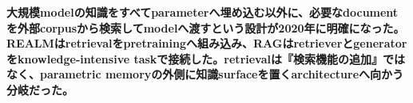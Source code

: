 \noindent\textbf{大規模modelの知識をすべてparameterへ埋め込む以外に、必要なdocumentを外部corpusから検索してmodelへ渡すという設計が2020年に明確になった。REALMはretrievalをpretrainingへ組み込み、RAGはretrieverとgeneratorをknowledge-intensive taskで接続した。retrievalは『検索機能の追加』ではなく、parametric memoryの外側に知識surfaceを置くarchitectureへ向かう分岐だった。}\autocite{src-38c08ba169f1,src-4bf65d8fc7dc,src-c441b6f2b8f4}
